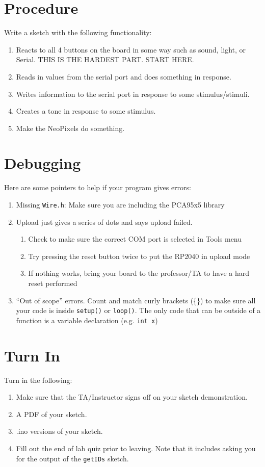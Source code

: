\section{Procedure}
Write a sketch with the following functionality:
\begin{enumerate}
    \item Reacts to all 4 buttons on the board in some way such as sound, light, or Serial. 
            THIS IS THE HARDEST PART. START HERE.
    \item Reads in values from the serial port and does something in response.
    \item Writes information to the serial port in response to some stimulus/stimuli.
    \item Creates a tone in response to some stimulus.
    \item Make the NeoPixels do something.
\end{enumerate}

\section{Debugging}
Here are some pointers to help if your program gives errors:
\begin{enumerate}
    \item Missing \lstinline|Wire.h|: Make sure you are including the PCA95x5 library
    \item Upload just gives a series of dots and says upload failed.
    \begin{enumerate}
        \item Check to make sure the correct COM port is selected in Tools menu
        \item Try pressing the reset button twice to put the RP2040 in upload mode 
        \item If nothing works, bring your board to the professor/TA to have a hard reset performed
    \end{enumerate}
    \item ``Out of scope'' errors. Count and match curly brackets (\{\}) to make sure all
                your code is inside \lstinline|setup()| or \lstinline|loop()|. The only code
                that can be outside of a function is a variable declaration (e.g. \lstinline|int x|)
\end{enumerate}

\section{Turn In}
Turn in the following:
\begin{enumerate}
    \item Make sure that the TA/Instructor signs off on your sketch demonstration.
    \item A PDF of your sketch.
    \item .ino versions of your sketch.
    \item Fill out the end of lab quiz prior to leaving. Note that it includes asking you 
            for the output of the \lstinline$getIDs$ sketch. 
\end{enumerate}